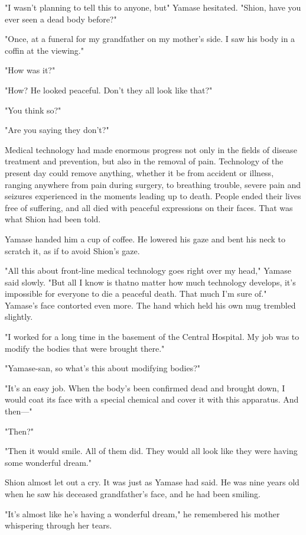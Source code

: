 "I wasn't planning to tell this to anyone, but\el " Yamase hesitated.
"Shion, have you ever seen a dead body before?"

"Once, at a funeral for my grandfather on my mother's side. I saw his
body in a coffin at the viewing."

"How was it?"

"How\el ? He looked peaceful. Don't they all look like that?"

"You think so?"

"Are you saying they don't?"

Medical technology had made enormous progress not only in the fields of
disease treatment and prevention, but also in the removal of pain.
Technology of the present day could remove anything, whether it be from
accident or illness, ranging anywhere from pain during surgery, to
breathing trouble, severe pain and seizures experienced in the moments
leading up to death. People ended their lives free of suffering, and all
died with peaceful expressions on their faces. That was what Shion had
been told.

Yamase handed him a cup of coffee. He lowered his gaze and bent his neck
to scratch it, as if to avoid Shion's gaze.

"All this about front-line medical technology goes right over my head,"
Yamase said slowly. "But all I know is that\el no matter how much
technology develops, it's impossible for everyone to die a peaceful
death. That much I'm sure of." Yamase's face contorted even more. The
hand which held his own mug trembled slightly.

"I worked for a long time in the basement of the Central Hospital. My
job was to modify the bodies that were brought there."

"Yamase-san, so what's this about modifying bodies?"

"It's an easy job. When the body's been confirmed dead and brought down,
I would coat its face with a special chemical and cover it with this
apparatus. And then---"

"Then?"

"Then it would smile. All of them did. They would all look like they
were having some wonderful dream."

Shion almost let out a cry. It was just as Yamase had said. He was nine
years old when he saw his deceased grandfather's face, and he had been
smiling.

"It's almost like he's having a wonderful dream," he remembered his
mother whispering through her tears.

